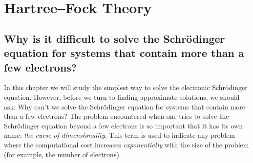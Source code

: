 \documentclass[../Main/notes.tex]{subfiles}
\begin{document}
\chapter{Hartree--Fock Theory}

\section{Why is it difficult to solve the Schr\"{o}dinger equation for systems that contain more than a few electrons?}


In this chapter we will study the simplest way to solve the electronic Schr\"{o}dinger equation.
However, before we turn to finding approximate solutions, we should ask: Why can't we solve the Schr\"{o}dinger equation for systems that contain more than a few electrons?
The problem encountered when one tries to solve the Schr\"{o}dinger equation beyond a few electrons is so important that it has its own name: \emph{the curse of dimensionality}.
This term is used to indicate any problem where the computational cost increases \emph{exponentially} with the size of the problem (for example, the number of electrons).
\end{document}
